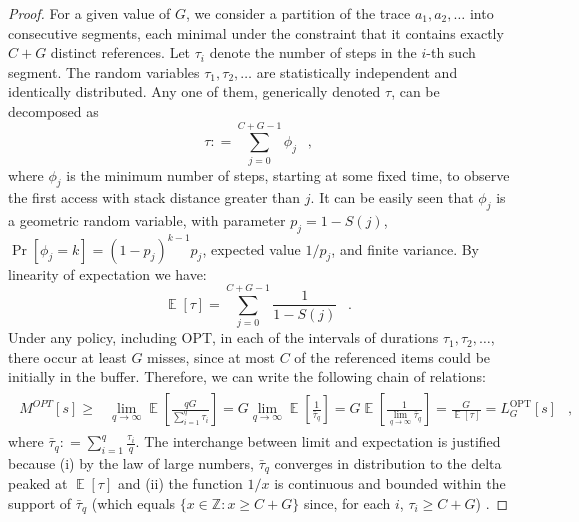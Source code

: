 \documentclass[11pt,a4paper]{article}
\DeclareMathOperator{\E}{\mathbb{E}}
\DeclareMathOperator{\Pb}{Pr}
\DeclareMathOperator{\opt}{OPT}
\DeclareMathOperator{\mf}{\enspace .}
\DeclareMathOperator{\mc}{\enspace ,}
\newcommand{\deq}{\mathrel{\mathop:}=}
\newcommand{\Z}{\mathbb{Z}}
\theoremstyle{definition}
\theoremstyle{remark}
\begin{document}
\begin{proof} For a given value of $G$, we consider a partition of the trace
  $a_1, a_2, \ldots$ into consecutive segments, each minimal under the
  constraint that it contains exactly $C+G$ distinct references. Let $\tau_i$
  denote the number of steps in the $i$-th such segment.  The random variables
  $\tau_1, \tau_2, \ldots$ are statistically independent and identically
  distributed. Any one of them, generically denoted $\tau$, can be decomposed as
  \begin{equation}
    \tau \deq \sum_{j=0}^{C+G-1} \phi_j \mc
  \end{equation}
  where $\phi_j$ is the minimum number of steps, starting at some fixed
  time, to observe the first access with stack distance greater than $j$. It
  can be easily seen that $\phi_j$ is a geometric random variable, with
  parameter $p_j=1-S(j)$, $\Pb[\phi_j=k]=(1-p_j)^{k-1}p_j$, expected
  value $1/p_j$, and finite variance. By linearity of expectation we have:
  \begin{equation}
    \E[\tau] =  \sum_{j=0}^{C+G-1} \frac{1}{1-S(j)} \mf
  \end{equation}
  Under any policy, including OPT, in each of the intervals of
  durations $\tau_1,\tau_2, \ldots $, there occur at least $G$ misses,
  since at most $C$ of the referenced items could be initially in the
  buffer. Therefore, we can write the following chain of relations:
  \begin{align}
    \begin{split}
      M^{OPT}[s] \geq& \lim_{q\rightarrow\infty}
     \E\left[\frac{q G}{\sum_{i=1}^{q}\tau_i}\right]
     = G \lim_{q\rightarrow\infty} \E\left[\frac{1}{\bar \tau_q}\right]
      = G \E \left[ \frac{1}{\lim_{q\rightarrow\infty} \bar \tau_q}\right]
      = \frac{G}{\E[\tau]} = L^{\opt}_G[s]\mc
    \end{split}
  \end{align}
  where $\bar \tau_q\deq\sum_{i=1}^q \frac{\tau_i}{q}$. The
  interchange between limit and expectation is justified because (i)
  by the law of large numbers, $\bar \tau_q$ converges in distribution
  to the delta peaked at $\E[\tau]$ and (ii) the function $1/x$ is
  continuous and bounded within the support of $\bar \tau_q$ (which
  equals $\{x\in\Z : x\geq C+G\}$ since, for each $i$, $\tau_i \geq
  C+G$) \cite{Loeve77}.
\end{proof}
\end{document}
